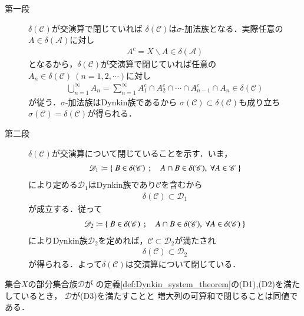 	\begin{prf}\mbox{}
		\begin{description}
			\item[第一段]
				$\delta(\mathscr{C})$が交演算で閉じていれば
				$\delta(\mathscr{C})$は$\sigma$-加法族となる．実際任意の$A \in \delta(\mathscr{A})$に対し
				\begin{align}
					A^c = X \backslash A \in \delta(\mathscr{A})
				\end{align}
				となるから，$\delta(\mathscr{C})$が交演算で閉じていれば任意の
				$A_n \in \delta(\mathscr{C})\ (n=1,2,\cdots)$に対し
				\begin{align}
					\bigcup_{n=1}^{\infty} A_n
					= \sum_{n=1}^{\infty} A_1^c \cap A_2^c \cap \cdots \cap A_{n-1}^c \cap A_n
					\in \delta(\mathscr{C})
				\end{align}
				が従う．$\sigma$-加法族はDynkin族であるから
				$\sigma(\mathscr{C}) \subset \delta(\mathscr{C})$も成り立ち
				$\sigma(\mathscr{C}) = \delta(\mathscr{C})$が得られる．
			
			\item[第二段]
				$\delta(\mathscr{C})$が交演算について閉じていることを示す．いま，
				\begin{align}
					\mathscr{D}_1 \coloneqq
					\Set{B \in \delta(\mathscr{C})}{ A \cap B \in \delta(\mathscr{C}),\ 
					\forall A \in \mathscr{C}}
				\end{align}
				により定める$\mathscr{D}_1$はDynkin族であり$\mathscr{C}$を含むから
				\begin{align}
					\delta(\mathscr{C}) \subset \mathscr{D}_1
				\end{align}
				が成立する．従って
				\begin{align}
					\mathscr{D}_2 \coloneqq
					\Set{B \in \delta(\mathscr{C})}{ A \cap B \in \delta(\mathscr{C}),\ 
					\forall A \in \delta(\mathscr{C})}
				\end{align}
				によりDynkin族$\mathscr{D}_2$を定めれば，$\mathscr{C} \subset \mathscr{D}_2$が満たされ
				\begin{align}
					\delta(\mathscr{C}) \subset \mathscr{D}_2
				\end{align}
				が得られる．よって$\delta(\mathscr{C})$は交演算について閉じている．
				\QED
		\end{description}
	\end{prf}
	
	\begin{screen}
		\begin{thm}
			集合$X$の部分集合族$\mathscr{D}$が
			の定義\ref{def:Dynkin_system_theorem}の(D1),(D2)を満たしているとき，
			$\mathscr{D}$が(D3)を満たすことと
			増大列の可算和で閉じることは同値である．
		\end{thm}
	\end{screen}
	
